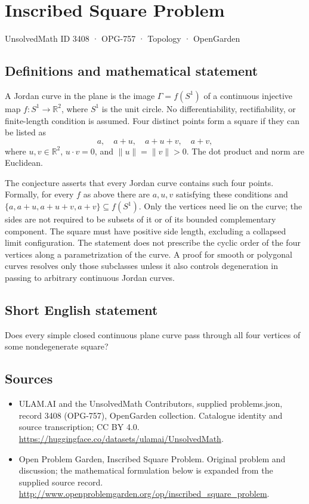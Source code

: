 \documentclass[11pt,a4paper]{article}
\begin{document}
\section*{Inscribed Square Problem}\label{3408}
{\small UnsolvedMath ID 3408 · OPG-757 · Topology · OpenGarden}
\subsection{Definitions and mathematical statement}
A Jordan curve in the plane is the image $\Gamma=f(S^1)$ of a
continuous injective map $f:S^1\to\mathbb R^2$, where $S^1$ is the
unit circle. No differentiability, rectifiability, or finite-length
condition is assumed. Four distinct points form a square if they
can be listed as
\[
             a,\quad a+u,\quad a+u+v,\quad a+v,
\]
where $u,v\in\mathbb R^2$, $u\cdot v=0$, and
$\|u\|=\|v\|>0$. The dot product and norm are Euclidean.

The conjecture asserts that every Jordan curve contains such four
points. Formally, for every $f$ as above there are $a,u,v$ satisfying
these conditions and
$\{a,a+u,a+u+v,a+v\}\subseteq f(S^1)$. Only the vertices need lie
on the curve; the sides are not required to be subsets of it or
of its bounded complementary component.
The square must have positive side length, excluding a collapsed
limit configuration. The statement does not prescribe the cyclic
order of the four vertices along a parametrization of the curve.
A proof for smooth or polygonal curves resolves only those
subclasses unless it also controls degeneration in passing to
arbitrary continuous Jordan curves.
\subsection{Short English statement}
Does every simple closed continuous plane curve pass through all four vertices of some nondegenerate square?
\subsection{Sources}
\begin{itemize}
\item[S1] ULAM.AI and the UnsolvedMath Contributors, supplied problems.json, record 3408 (OPG-757), OpenGarden collection. Catalogue identity and source transcription; CC BY 4.0.
\url{https://huggingface.co/datasets/ulamai/UnsolvedMath}.
\item[S2] Open Problem Garden, Inscribed Square Problem. Original problem and discussion; the mathematical formulation below is expanded from the supplied source record.
\url{http://www.openproblemgarden.org/op/inscribed_square_problem}.
\end{itemize}
\end{document}
